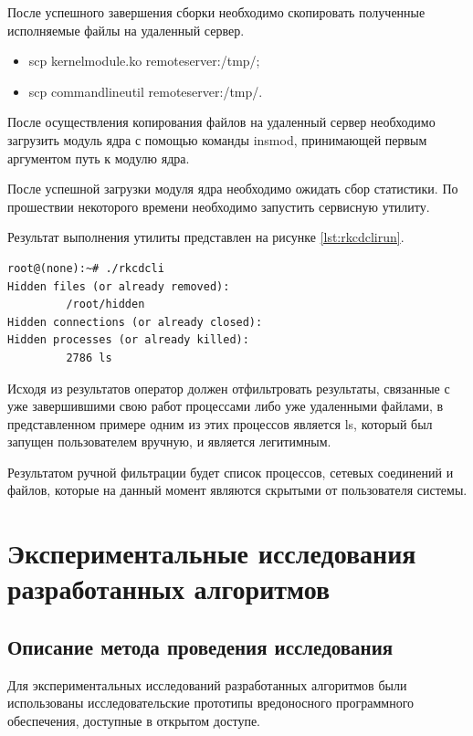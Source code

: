 \documentclass{gost7.32-2001}
\begin{document}
После успешного завершения сборки необходимо скопировать полученные
исполняемые файлы на удаленный сервер.

\begin{itemize}
\item
  scp kernelmodule.ko remoteserver:/tmp/;
\item
  scp commandlineutil remoteserver:/tmp/.
\end{itemize}

После осуществления копирования файлов на удаленный сервер необходимо
загрузить модуль ядра с помощью команды insmod, принимающей первым
аргументом путь к модулю ядра.

После успешной загрузки модуля ядра необходимо ожидать сбор
статистики. По прошествии некоторого времени необходимо запустить
сервисную утилиту.

Результат выполнения утилиты представлен на рисунке
\ref{lst:rkcdclirun}.

\begin{lstlisting}[caption={Результат выполнения сервисной утилиты},
    captionpos=b, float, label={lst:rkcdclirun}]
root@(none):~# ./rkcdcli
Hidden files (or already removed):
         /root/hidden
Hidden connections (or already closed):
Hidden processes (or already killed):
         2786 ls
\end{lstlisting}

Исходя из результатов оператор должен отфильтровать результаты,
связанные с уже завершившими свою работ процессами либо уже удаленными
файлами, в представленном примере одним из этих процессов является ls,
который был запущен пользователем вручную, и является легитимным.

Результатом ручной фильтрации будет список процессов, сетевых
соединений и файлов, которые на данный момент являются скрытыми от
пользователя системы.

\newpage
\section{Экспериментальные исследования разработанных алгоритмов}
\subsection{Описание метода проведения исследования}

Для экспериментальных исследований разработанных алгоритмов были
использованы исследовательские прототипы вредоносного программного
обеспечения, доступные в открытом доступе.
\end{document}
